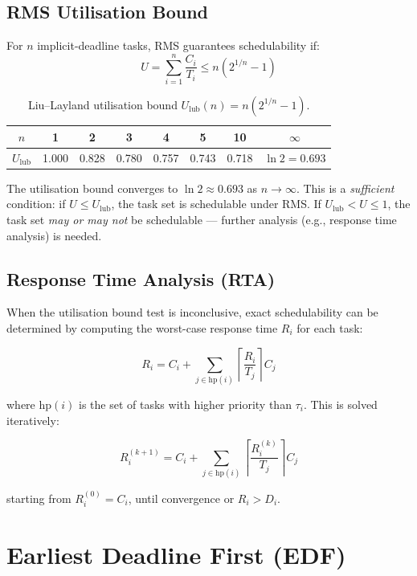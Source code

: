\subsection{RMS Utilisation Bound}

For $n$ implicit-deadline tasks, RMS guarantees schedulability if:
\[
U = \sum_{i=1}^{n} \frac{C_i}{T_i} \leq n\left(2^{1/n} - 1\right)
\]

\begin{table}[H]
\centering
\caption{Liu--Layland utilisation bound $U_{\mathrm{lub}}(n) = n(2^{1/n} - 1)$.}
\label{tab:sched:ulub}
\begin{tabular}{@{}cccccccc@{}}
\toprule
$n$ & 1 & 2 & 3 & 4 & 5 & 10 & $\infty$ \\
\midrule
$U_{\mathrm{lub}}$ & 1.000 & 0.828 & 0.780 & 0.757 & 0.743 & 0.718 & $\ln 2 = 0.693$ \\
\bottomrule
\end{tabular}
\end{table}

\begin{insight}
The utilisation bound converges to $\ln 2 \approx 0.693$ as $n \to \infty$. This is a \emph{sufficient} condition: if $U \leq U_{\mathrm{lub}}$, the task set is schedulable under RMS. If $U_{\mathrm{lub}} < U \leq 1$, the task set \emph{may or may not} be schedulable --- further analysis (e.g., response time analysis) is needed.
\end{insight}

\subsection{Response Time Analysis (RTA)}

When the utilisation bound test is inconclusive, exact schedulability can be determined by computing the worst-case response time $R_i$ for each task:

\[
R_i = C_i + \sum_{j \in \mathrm{hp}(i)} \left\lceil \frac{R_i}{T_j} \right\rceil C_j
\]

where $\mathrm{hp}(i)$ is the set of tasks with higher priority than $\tau_i$. This is solved iteratively:

\[
R_i^{(k+1)} = C_i + \sum_{j \in \mathrm{hp}(i)} \left\lceil \frac{R_i^{(k)}}{T_j} \right\rceil C_j
\]

starting from $R_i^{(0)} = C_i$, until convergence or $R_i > D_i$.

\section{Earliest Deadline First (EDF)}
\label{sec:sched:edf}

